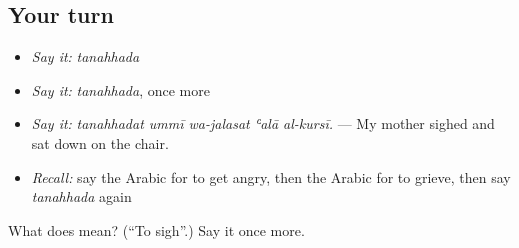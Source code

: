 \subsection*{Your turn}
\begin{itemize}
\raggedright
  \item \emph{Say it:} \emph{tanahhada}
  \item \emph{Say it:} \emph{tanahhada}, once more
  \item \emph{Say it:} \emph{tanahhadat ummī wa-jalasat ʿalā al-kursī.} — My mother sighed and sat down on the chair.
  \item \emph{Recall:} say the Arabic for to get angry, then the Arabic for to grieve, then say \emph{tanahhada} again
\end{itemize}

\begin{tcolorbox}[breakable,colback=teal!4,colframe=teal!35!black,title={Before you move on}]
What does  mean? (\textquotedblleft{}To sigh\textquotedblright{}.) Say it once more.
\end{tcolorbox}
